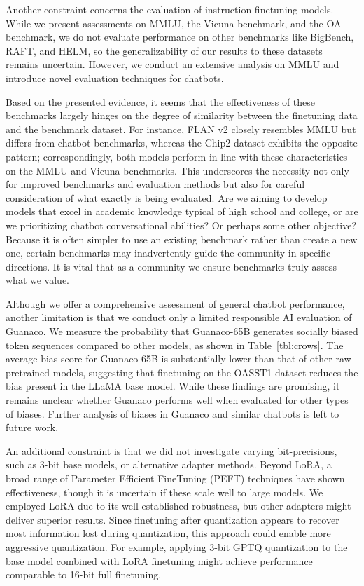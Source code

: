 Another constraint concerns the evaluation of instruction finetuning models. While we present assessments on MMLU, the Vicuna benchmark, and the OA benchmark, we do not evaluate performance on other benchmarks like BigBench, RAFT, and HELM, so the generalizability of our results to these datasets remains uncertain. However, we conduct an extensive analysis on MMLU and introduce novel evaluation techniques for chatbots.

Based on the presented evidence, it seems that the effectiveness of these benchmarks largely hinges on the degree of similarity between the finetuning data and the benchmark dataset. For instance, FLAN v2 closely resembles MMLU but differs from chatbot benchmarks, whereas the Chip2 dataset exhibits the opposite pattern; correspondingly, both models perform in line with these characteristics on the MMLU and Vicuna benchmarks. This underscores the necessity not only for improved benchmarks and evaluation methods but also for careful consideration of what exactly is being evaluated. Are we aiming to develop models that excel in academic knowledge typical of high school and college, or are we prioritizing chatbot conversational abilities? Or perhaps some other objective? Because it is often simpler to use an existing benchmark rather than create a new one, certain benchmarks may inadvertently guide the community in specific directions. It is vital that as a community we ensure benchmarks truly assess what we value.

Although we offer a comprehensive assessment of general chatbot performance, another limitation is that we conduct only a limited responsible AI evaluation of {Guanaco}. We measure the probability that {Guanaco}-65B generates socially biased token sequences compared to other models, as shown in Table~\ref{tbl:crows}. The average bias score for {Guanaco}-65B is substantially lower than that of other raw pretrained models, suggesting that finetuning on the OASST1 dataset reduces the bias present in the LLaMA base model. While these findings are promising, it remains unclear whether {Guanaco} performs well when evaluated for other types of biases. Further analysis of biases in {Guanaco} and similar chatbots is left to future work.

An additional constraint is that we did not investigate varying bit-precisions, such as 3-bit base models, or alternative adapter methods. Beyond LoRA, a broad range of Parameter Efficient FineTuning (PEFT) techniques have shown effectiveness, though it is uncertain if these scale well to large models. We employed LoRA due to its well-established robustness, but other adapters might deliver superior results. Since finetuning after quantization appears to recover most information lost during quantization, this approach could enable more aggressive quantization. For example, applying 3-bit GPTQ quantization to the base model combined with LoRA finetuning might achieve performance comparable to 16-bit full finetuning.

